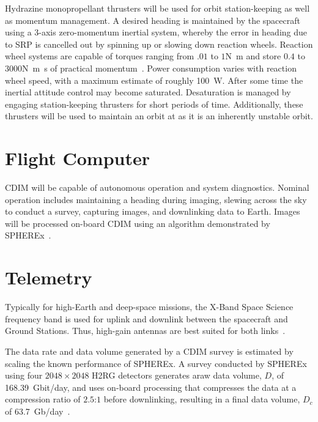 \documentclass{ws-jai}
\begin{document}
Hydrazine monopropellant thrusters will be used for orbit station-keeping as well as momentum management.
A desired heading is maintained by the spacecraft using a 3-axis zero-momentum inertial system, whereby the error in heading due to SRP is cancelled out by spinning up or slowing down reaction wheels.
Reaction wheel systems are capable of torques ranging from $.01$ to $1$\si{\newton\meter} and store $0.4$ to $3000$\si{\newton\meter\second} of practical momentum~\cite{smad2015}.
Power consumption varies with reaction wheel speed, with a maximum estimate of roughly \SI{100}{\watt}.
After some time the inertial attitude control may become saturated.
Desaturation is managed by engaging station-keeping thrusters for short periods of time.
Additionally, these thrusters will be used to maintain an orbit at \Ltwo{} as it is an inherently unstable orbit.

\section{Flight Computer}
CDIM will be capable of autonomous operation and system diagnostics.
Nominal operation includes maintaining a heading during imaging, slewing across the sky to conduct a survey, capturing images, and downlinking data to Earth.
Images will be processed on-board CDIM using an algorithm demonstrated by SPHEREx~\cite{spherexTelemetry2016}.

\section{Telemetry}
\label{sec:telemetry}
Typically for high-Earth and deep-space missions, the X-Band Space Science frequency band is used for uplink and downlink between the spacecraft and Ground Stations.
Thus, high-gain antennas are best suited for both links~\cite{smad2015}.

The data rate and data volume generated by a CDIM survey is estimated by scaling the known performance of SPHEREx.
A survey conducted by SPHEREx using four $2048\times2048$ H2RG detectors generates araw data volume, $D$, of \SI{168.39}{Gbit/day}, and uses on-board processing that compresses the data at a compression ratio of $2.5$:$1$ before downlinking, resulting in a final data volume, $D_c$ of \SI{63.7}{Gb/day}~\cite{spherexTelemetry2016}.
\end{document}
